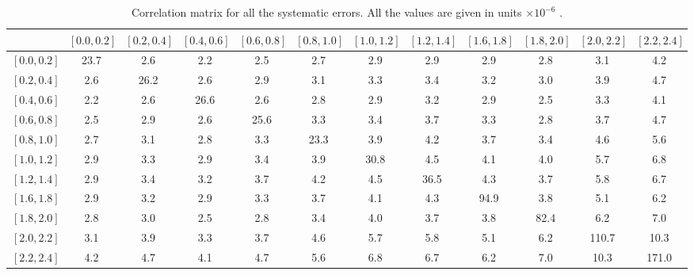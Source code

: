 \begin{table}[htbp]
   \begin{center}
      \begin{sideways}
      \begin{tabular}{l|ccccccccccc}
\midrule
& \scriptsize{$\left[0.0,0.2\right]$}
& \scriptsize{$\left[0.2,0.4\right]$}
& \scriptsize{$\left[0.4,0.6\right]$}
& \scriptsize{$\left[0.6,0.8\right]$}
& \scriptsize{$\left[0.8,1.0\right]$}
& \scriptsize{$\left[1.0,1.2\right]$}
& \scriptsize{$\left[1.2,1.4\right]$}
& \scriptsize{$\left[1.6,1.8\right]$}
& \scriptsize{$\left[1.8,2.0\right]$}
& \scriptsize{$\left[2.0,2.2\right]$}
& \scriptsize{$\left[2.2,2.4\right]$} \\ \midrule
\scriptsize{$\left[0.0,0.2\right]$} & 23.7 & 2.6 & 2.2 & 2.5 & 2.7 & 2.9 & 2.9 & 2.9 & 2.8 & 3.1 & 4.2 \\
\scriptsize{$\left[0.2,0.4\right]$} & 2.6 & 26.2 & 2.6 & 2.9 & 3.1 & 3.3 & 3.4 & 3.2 & 3.0 & 3.9 & 4.7 \\
\scriptsize{$\left[0.4,0.6\right]$} & 2.2 & 2.6 & 26.6 & 2.6 & 2.8 & 2.9 & 3.2 & 2.9 & 2.5 & 3.3 & 4.1 \\
\scriptsize{$\left[0.6,0.8\right]$} & 2.5 & 2.9 & 2.6 & 25.6 & 3.3 & 3.4 & 3.7 & 3.3 & 2.8 & 3.7 & 4.7 \\
\scriptsize{$\left[0.8,1.0\right]$} & 2.7 & 3.1 & 2.8 & 3.3 & 23.3 & 3.9 & 4.2 & 3.7 & 3.4 & 4.6 & 5.6 \\
\scriptsize{$\left[1.0,1.2\right]$} & 2.9 & 3.3 & 2.9 & 3.4 & 3.9 & 30.8 & 4.5 & 4.1 & 4.0 & 5.7 & 6.8 \\
\scriptsize{$\left[1.2,1.4\right]$} & 2.9 & 3.4 & 3.2 & 3.7 & 4.2 & 4.5 & 36.5 & 4.3 & 3.7 & 5.8 & 6.7 \\
\scriptsize{$\left[1.6,1.8\right]$} & 2.9 & 3.2 & 2.9 & 3.3 & 3.7 & 4.1 & 4.3 & 94.9 & 3.8 & 5.1 & 6.2 \\
\scriptsize{$\left[1.8,2.0\right]$} & 2.8 & 3.0 & 2.5 & 2.8 & 3.4 & 4.0 & 3.7 & 3.8 & 82.4 & 6.2 & 7.0 \\
\scriptsize{$\left[2.0,2.2\right]$} & 3.1 & 3.9 & 3.3 & 3.7 & 4.6 & 5.7 & 5.8 & 5.1 & 6.2 & 110.7 & 10.3 \\
\scriptsize{$\left[2.2,2.4\right]$} & 4.2 & 4.7 & 4.1 & 4.7 & 5.6 & 6.8 & 6.7 & 6.2 & 7.0 & 10.3 & 171.0 \\
\bottomrule
    \end{tabular}
    \end{sideways}
    \end{center}
  \caption{\label{tab:corr_tot}Correlation matrix for all the systematic errors.
All the values are given in units $\times 10^{-6}$ \cite{bendavid2011electron}.}
\end{table}

